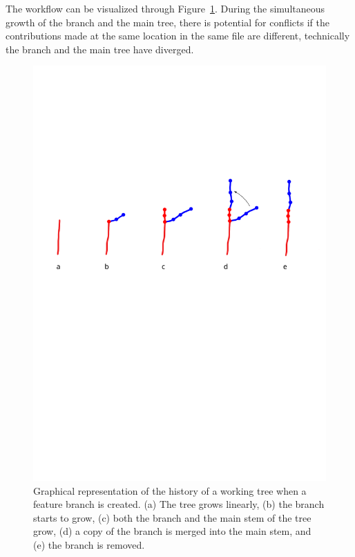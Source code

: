 \documentclass[10pt]{article}
\begin{document}
The workflow can be visualized through Figure~\ref{fig:feature-happy-path}. 
During the simultaneous growth of the branch and the main tree, there is potential for conflicts if the contributions made at the same location in the same file are different, technically the branch and the main tree have diverged.


\begin{figure}[hb!]
    \centering
    \includegraphics[width=\textwidth,trim={0cm 15cm 0 8cm},clip]{images/featurebranch_happy_path.png}
    \caption{Graphical representation of the history of a working tree when a feature branch is created. (a) The tree grows linearly, (b) the branch starts to grow, (c) both the branch and the main stem of the tree grow, (d) a copy of the branch is merged into the main stem, and (e) the branch is removed.}
    \label{fig:feature-happy-path}
\end{figure}
\end{document}
